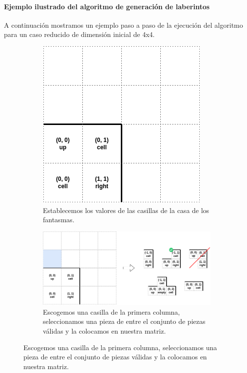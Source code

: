 \paragraph{Ejemplo ilustrado del algoritmo de generación de laberintos}\label{par:ejemplo}

A continuación mostramos un ejemplo paso a paso de la ejecución del algoritmo para un caso reducido de dimensión inicial de 4x4.

    \begin{figure}[H]
    \centering
        \begin{subfigure}[b]{0.9\textwidth}
            \centering
            \includegraphics[scale=0.4]{img/paso1.png}
            \caption{Establecemos los valores de las casillas de la casa de los fantasmas.}
        \end{subfigure}
        \par\bigskip
        \begin{subfigure}[b]{0.9\textwidth}
            \centering
            \includegraphics[scale=0.4]{img/paso2.png}
            \caption{Escogemos una casilla de la primera columna, seleccionamos una pieza de entre el conjunto de piezas válidas y la colocamos en nuestra matriz.}

\end{subfigure}
\end{figure}

